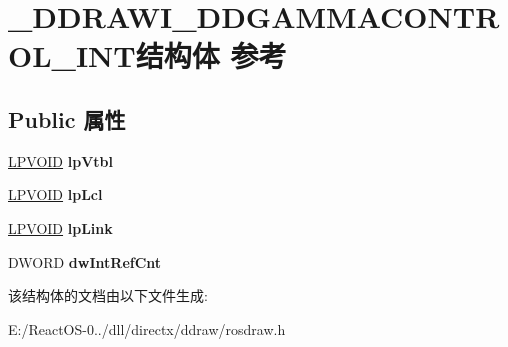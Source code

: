 \hypertarget{struct___d_d_r_a_w_i___d_d_g_a_m_m_a_c_o_n_t_r_o_l___i_n_t}{}\section{\+\_\+\+D\+D\+R\+A\+W\+I\+\_\+\+D\+D\+G\+A\+M\+M\+A\+C\+O\+N\+T\+R\+O\+L\+\_\+\+I\+N\+T结构体 参考}
\label{struct___d_d_r_a_w_i___d_d_g_a_m_m_a_c_o_n_t_r_o_l___i_n_t}
\subsection*{Public 属性}
\begin{DoxyCompactItemize}
\item 
\mbox{\label{struct___d_d_r_a_w_i___d_d_g_a_m_m_a_c_o_n_t_r_o_l___i_n_t_a17b21dbf9bf7ce429e8afb9406276d77}} 
\hyperlink{interfacevoid}{L\+P\+V\+O\+ID} {\bfseries lp\+Vtbl}
\item 
\mbox{\label{struct___d_d_r_a_w_i___d_d_g_a_m_m_a_c_o_n_t_r_o_l___i_n_t_aeec567c98097834252159df4012dfbbb}} 
\hyperlink{interfacevoid}{L\+P\+V\+O\+ID} {\bfseries lp\+Lcl}
\item 
\mbox{\label{struct___d_d_r_a_w_i___d_d_g_a_m_m_a_c_o_n_t_r_o_l___i_n_t_a294124d1faa42adf533cf57a1b5c6a96}} 
\hyperlink{interfacevoid}{L\+P\+V\+O\+ID} {\bfseries lp\+Link}
\item 
\mbox{\label{struct___d_d_r_a_w_i___d_d_g_a_m_m_a_c_o_n_t_r_o_l___i_n_t_a32b3cf73a68500824d1f7e896052f178}} 
D\+W\+O\+RD {\bfseries dw\+Int\+Ref\+Cnt}
\end{DoxyCompactItemize}


该结构体的文档由以下文件生成\+:\begin{DoxyCompactItemize}
\item 
E\+:/\+React\+O\+S-\/0../dll/directx/ddraw/rosdraw.\+h\end{DoxyCompactItemize}
